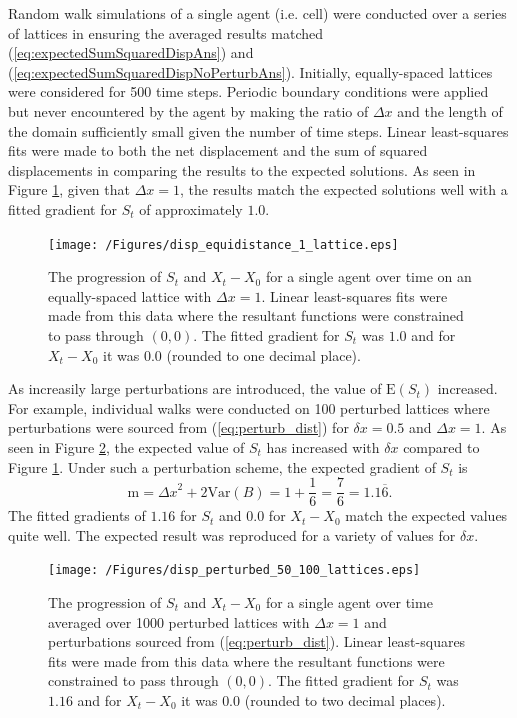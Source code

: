 \documentclass[11pt,titlepage,a4paper]{article}
\begin{document}
			Random walk simulations of a single agent (i.e. cell) were conducted over a series of lattices in ensuring the averaged results matched (\ref{eq:expectedSumSquaredDispAns}) and (\ref{eq:expectedSumSquaredDispNoPerturbAns}). Initially, equally-spaced lattices were considered for 500 time steps. Periodic boundary conditions were applied but never encountered by the agent by making the ratio of $\Delta x$ and the length of the domain sufficiently small given the number of time steps. Linear least-squares fits were made to both the net displacement and the sum of squared displacements in comparing the results to the expected solutions. As seen in Figure \ref{fig:disp_equidistance_1_lattice}, given that $\Delta x = 1$, the results match the expected solutions well with a fitted gradient for $S_t$ of approximately $1.0$. 

			\begin{figure}[tbh]
				\centering
					\texttt{[image: /Figures/disp\_equidistance\_1\_lattice.eps]}
				\caption{The progression of $S_t$ and $X_t - X_0$ for a single agent over time on an equally-spaced lattice with $\Delta x = 1$. Linear least-squares fits were made from this data where the resultant functions were constrained to pass through $(0,0)$. The fitted gradient for $S_t$ was $1.0$ and for $X_t - X_0$ it was $0.0$ (rounded to one decimal place).}
				\label{fig:disp_equidistance_1_lattice}
			\end{figure}

			As increasily large perturbations are introduced, the value of $\mathrm{E} \left(S_t \right)$ increased. For example, individual walks were conducted on 100 perturbed lattices where perturbations were sourced from (\ref{eq:perturb_dist}) for $\delta x = 0.5$ and $\Delta x = 1$. As seen in Figure \ref{fig:disp_perturbed_50_100_lattices}, the expected value of $S_t$ has increased with $\delta x$ compared to Figure \ref{fig:disp_equidistance_1_lattice}. Under such a perturbation scheme, the expected gradient of $S_t$ is  
			\begin{equation*}
				\text{m} = {\Delta x}^2 + 2 \mathrm{Var} \left(B \right) =  1 + \frac{1}{6} = \frac{7}{6} = 1.1\overline{6}.
			\end{equation*}
			The fitted gradients of $1.16$ for $S_t$ and $0.0$ for $X_t - X_0$ match the expected values quite well. The expected result was reproduced for a variety of values for $\delta x$.

			\begin{figure}[tbh]
				\centering
					\texttt{[image: /Figures/disp\_perturbed\_50\_100\_lattices.eps]}
				\caption{The progression of $S_t$ and $X_t - X_0$ for a single agent over time averaged over 1000 perturbed lattices with $\Delta x = 1$ and perturbations sourced from (\ref{eq:perturb_dist}). Linear least-squares fits were made from this data where the resultant functions were constrained to pass through $(0,0)$. The fitted gradient for $S_t$ was $1.16$ and for $X_t - X_0$ it was $0.0$ (rounded to two decimal places).}
				\label{fig:disp_perturbed_50_100_lattices}
			\end{figure}
\end{document}
